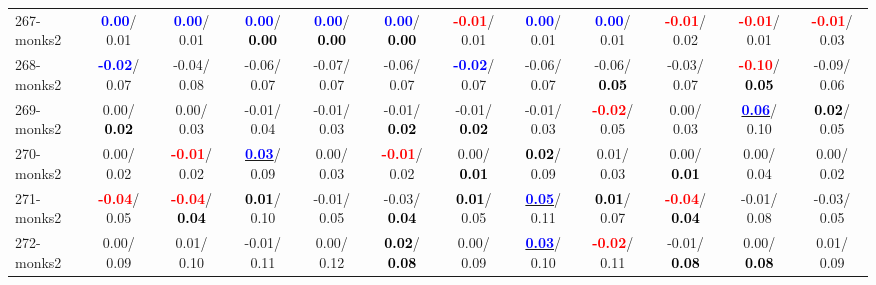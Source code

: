 \begin{table}[h]
\begin{center}
{\begin{tabular}{lc|c|c|c|c|c|c|c|c|c|c}
267-monks2 & \textcolor{blue}{\textbf{  0.00}}/  0.01 & \textcolor{blue}{\textbf{  0.00}}/  0.01 & \textcolor{blue}{\textbf{  0.00}}/\textcolor{black}{\textbf{  0.00}} & \textcolor{blue}{\textbf{  0.00}}/\textcolor{black}{\textbf{  0.00}} & \textcolor{blue}{\textbf{  0.00}}/\textcolor{black}{\textbf{  0.00}} & \textcolor{red}{\textbf{ -0.01}}/  0.01 & \textcolor{blue}{\textbf{  0.00}}/  0.01 & \textcolor{blue}{\textbf{  0.00}}/  0.01 & \textcolor{red}{\textbf{ -0.01}}/  0.02 & \textcolor{red}{\textbf{ -0.01}}/  0.01 & \textcolor{red}{\textbf{ -0.01}}/  0.03 \\
268-monks2 & \textcolor{blue}{\textbf{ -0.02}}/  0.07 &  -0.04/  0.08 &  -0.06/  0.07 &  -0.07/  0.07 &  -0.06/  0.07 & \textcolor{blue}{\textbf{ -0.02}}/  0.07 &  -0.06/  0.07 &  -0.06/\textcolor{black}{\textbf{  0.05}} &  -0.03/  0.07 & \textcolor{red}{\textbf{ -0.10}}/\textcolor{black}{\textbf{  0.05}} &  -0.09/  0.06 \\
269-monks2 &   0.00/\textcolor{black}{\textbf{  0.02}} &   0.00/  0.03 &  -0.01/  0.04 &  -0.01/  0.03 &  -0.01/\textcolor{black}{\textbf{  0.02}} &  -0.01/\textcolor{black}{\textbf{  0.02}} &  -0.01/  0.03 & \textcolor{red}{\textbf{ -0.02}}/  0.05 &   0.00/  0.03 & \underline{\textcolor{blue}{\textbf{  0.06}}}/  0.10 & \textcolor{black}{\textbf{  0.02}}/  0.05 \\
270-monks2 &   0.00/  0.02 & \textcolor{red}{\textbf{ -0.01}}/  0.02 & \underline{\textcolor{blue}{\textbf{  0.03}}}/  0.09 &   0.00/  0.03 & \textcolor{red}{\textbf{ -0.01}}/  0.02 &   0.00/\textcolor{black}{\textbf{  0.01}} & \textcolor{black}{\textbf{  0.02}}/  0.09 &   0.01/  0.03 &   0.00/\textcolor{black}{\textbf{  0.01}} &   0.00/  0.04 &   0.00/  0.02 \\ \hline
271-monks2 & \textcolor{red}{\textbf{ -0.04}}/  0.05 & \textcolor{red}{\textbf{ -0.04}}/\textcolor{black}{\textbf{  0.04}} & \textcolor{black}{\textbf{  0.01}}/  0.10 &  -0.01/  0.05 &  -0.03/\textcolor{black}{\textbf{  0.04}} & \textcolor{black}{\textbf{  0.01}}/  0.05 & \underline{\textcolor{blue}{\textbf{  0.05}}}/  0.11 & \textcolor{black}{\textbf{  0.01}}/  0.07 & \textcolor{red}{\textbf{ -0.04}}/\textcolor{black}{\textbf{  0.04}} &  -0.01/  0.08 &  -0.03/  0.05 \\
272-monks2 &   0.00/  0.09 &   0.01/  0.10 &  -0.01/  0.11 &   0.00/  0.12 & \textcolor{black}{\textbf{  0.02}}/\textcolor{black}{\textbf{  0.08}} &   0.00/  0.09 & \underline{\textcolor{blue}{\textbf{  0.03}}}/  0.10 & \textcolor{red}{\textbf{ -0.02}}/  0.11 &  -0.01/\textcolor{black}{\textbf{  0.08}} &   0.00/\textcolor{black}{\textbf{  0.08}} &   0.01/  0.09 \\

\end{tabular}}
\end{center}
\end{table}
